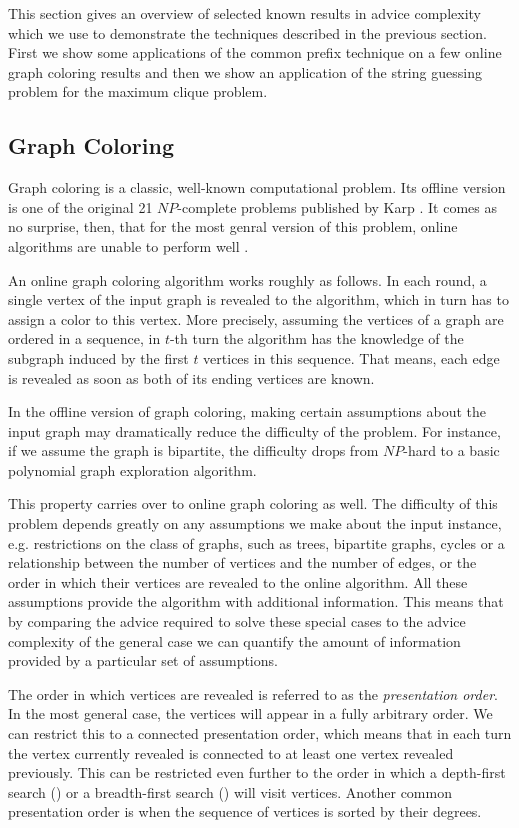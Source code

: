 This section gives an overview of selected known results in advice
complexity which we use to demonstrate the techniques described in the
previous section. First we show some applications of the common prefix
technique on a few online graph coloring results and then we show an
application of the string guessing problem for the maximum clique problem.

\subsection{Graph Coloring}
Graph coloring is a classic, well-known computational problem. Its offline
version is one of the original 21 $NP$-complete problems published by Karp
\cite{karp-np}. It comes as no surprise, then, that for the most genral
version of this problem, online algorithms are unable to perform well
\cite{online-graph-bound}.

An online graph coloring algorithm works roughly as follows. In each
round, a single vertex of the input graph is revealed to the algorithm,
which in turn has to assign a color to this vertex. More precisely,
assuming the vertices of a graph are ordered in a sequence, in $t$-th turn
the algorithm has the knowledge of the subgraph induced by the first $t$
vertices in this sequence. That means, each edge is revealed as soon as
both of its ending vertices are known.

In the offline version of graph coloring, making certain assumptions about
the input graph may dramatically reduce the difficulty of the problem. For
instance, if we assume the graph is bipartite, the difficulty drops from
$NP$-hard to a basic polynomial graph exploration algorithm.

This property carries over to online graph coloring as well. The
difficulty of this problem depends greatly on any assumptions we make
about the input instance, e.g. restrictions on the class of graphs, such
as trees, bipartite graphs, cycles or a relationship between the number of
vertices and the number of edges, or the order in which their vertices are
revealed to the online algorithm. All these assumptions provide the
algorithm with additional information. This means that by comparing the
advice required to solve these special cases to the advice complexity of
the general case we can quantify the amount of information provided by a
particular set of assumptions.

The order in which vertices are revealed is referred to as the
\emph{presentation order}. In the most general case, the vertices will
appear in a fully arbitrary order. We can restrict this to a connected
presentation order, which means that in each turn the vertex currently
revealed is connected to at least one vertex revealed previously. This can
be restricted even further to the order in which a depth-first search
() or a breadth-first search () will visit
vertices. Another common presentation order is when the sequence of
vertices is sorted by their degrees.

